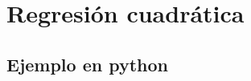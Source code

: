 \chapter{Regresión cuadrática}
\label{appendix:regresion_cuadratica}

\section{Ejemplo en python}
\inputminted{python}{apendices/regresion_cuadratica.py}
